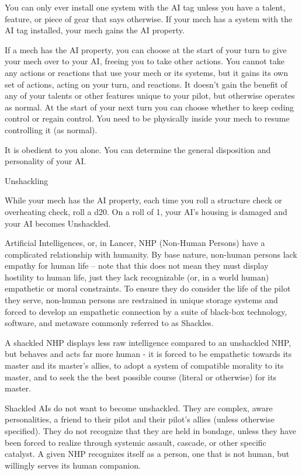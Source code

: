 You can only ever install one system with the AI tag unless you have a talent, feature, or piece  
of gear that says otherwise. If your mech has a system with the AI tag installed, your mech gains  
the AI property. 
 

If a mech has the AI property, you can choose at the start of your turn to give your mech over to  
your AI, freeing you to take other actions. You cannot take any actions or reactions that use your  
mech or its systems, but it gains its own set of actions, acting on your turn, and reactions. It  
doesn’t gain the benefit of any of your talents or other features unique to your pilot, but  
otherwise operates as normal. At the start of your next turn you can choose whether to keep  
ceding control or regain control. You need to be physically inside your mech to resume  
controlling it (as normal).
 

It is obedient to you alone. You can determine the general disposition and personality of your AI. 
 

                                                 Unshackling  

                                                                                                               


While your mech has the AI property, each time you roll a structure check or overheating  
check, roll a d20. On a roll of 1, your AI’s housing is damaged and your AI becomes Unshackled.
 

Artificial Intelligences, or, in Lancer, NHP (Non-Human Persons) have a complicated relationship  
with humanity. By base nature, non-human persons lack empathy for human life -- note that this  
does not mean they must display hostility to human life, just they lack recognizable (or, in a world  
human) empathetic or moral constraints. To ensure they do consider the life of the pilot they  
serve, non-human persons are restrained in unique storage systems and forced to develop an  
empathetic connection by a suite of black-box technology, software, and metaware commonly  
referred to as Shackles. 
 

A shackled NHP displays less raw intelligence compared to an unshackled NHP, but behaves  
and acts far more human - it is forced to be empathetic towards its master and its master’s allies,  
to adopt a system of compatible morality to its master, and to seek the the best possible course  
(literal or otherwise) for its master. 
 

Shackled AIs do not want to become unshackled. They are complex, aware personalities, a  
friend to their pilot and their pilot’s allies (unless otherwise specified). They do not recognize that  
they are held in bondage, unless they have been forced to realize through systemic assault,  
cascade, or other specific catalyst. A given NHP recognizes itself as a person, one that is not  
human, but willingly serves its human companion.
 

